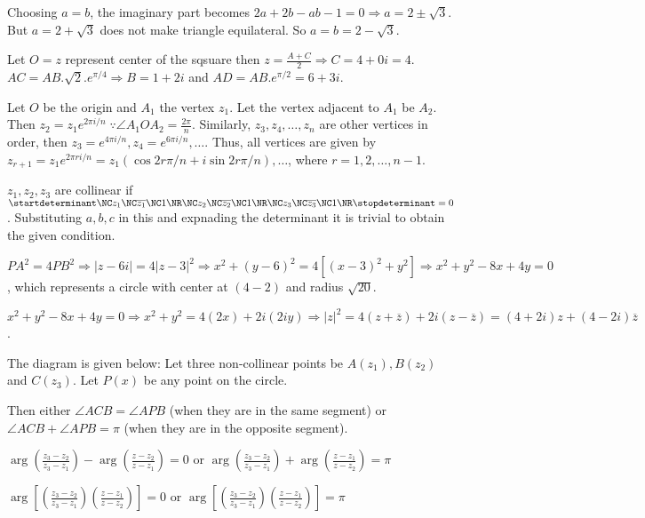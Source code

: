   Choosing $a = b$, the imaginary part becomes $2a + 2b - ab - 1 = 0 \Rightarrow a = 2 \pm \sqrt{3}$. But $a
  = 2 + \sqrt{3}$ does not make triangle equilateral. So $a = b = 2 - \sqrt{3}$.
\item Let $O = z$ represent center of the sqsuare then $z = \frac{A + C}{2} \Rightarrow C = 4 + 0i = 4$.
  $AC = AB.\sqrt{2}.e^{\pi/4} \Rightarrow B = 1 + 2i$ and $AD = AB.e^{\pi/2} = 6 + 3i$.
\item Let $O$ be the origin and $A_1$ the vertex $z_1$. Let the vertex adjacent to $A_1$ be $A_2$. Then $z_2
  = z_1e^{2\pi i/n}\;\because \angle A_1OA_2 = \frac{2\pi}{n}$. Similarly, $z_3, z_4, \ldots, z_n$ are other
  vertices in order, then $z_3 = e^{4\pi i/n}, z_4 = e^{6\pi i/n}, \ldots$. Thus, all vertices are given by
  $z_{r + 1} = z_1e^{2\pi ri/n} = z_1(\cos2r\pi/n + i\sin2r\pi/n), \ldots$, where $r = 1, 2, \ldots, n - 1$.
\item $z_1, z_2, z_3$ are collinear if $\startdeterminant\NC z_1 \NC \overline{z_1}\NC1\NR\NC z_2 \NC
  \overline{z_2}\NC1\NR\NC z_3 \NC \overline{z_3}\NC1 \NR\stopdeterminant=0$. Substituting $a, b, c$ in this
  and expnading the determinant it is trivial to obtain the given condition.
\item $PA^2 = 4PB^2 \Rightarrow |z - 6i| = 4|z - 3|^2 \Rightarrow x^2 + (y - 6)^2 = 4[(x - 3)^2 + y^2]
  \Rightarrow x^2 + y^2 - 8x + 4y = 0$, which represents a circle with center at $(4 -2)$ and radius
  $\sqrt{20}$.

  $x^2 + y^2 - 8x + 4y = 0 \Rightarrow x^2 + y^2 = 4(2x) + 2i(2iy) \Rightarrow |z|^2 = 4(z +
  \overline{z}) + 2i(z - \overline{z}) = (4 + 2i)z + (4 - 2i)\overline{z}$.
\item The diagram is given below:
  \startplacefigure[location={left, none}]
  \stopplacefigure
  Let three non-collinear points be $A(z_1), B(z_2)$ and $C(z_3)$. Let $P(x)$ be any point on the circle.

  Then either $\angle ACB = \angle APB$ (when they are in the same segment) or $\angle ACB + \angle APB =
  \pi$ (when they are in the opposite segment).

  $\arg\left(\frac{z_3 - z_2}{z_3 - z_1}\right) - \arg\left(\frac{z - z_2}{z - z_1}\right) = 0$ or
  $\arg\left(\frac{z_3 - z_2}{z_3 - z_1}\right) + \arg\left(\frac{z - z_1}{z - z_2}\right) = \pi$

  $\arg\left[\left(\frac{z_3 - z_2}{z_3 - z_1}\right)\left(\frac{z - z_1}{z - z_2}\right)\right] = 0$ or
  $\arg\left[\left(\frac{z_3 - z_2}{z_3 - z_1}\right)\left(\frac{z - z_1}{z - z_2}\right)\right] = \pi$


